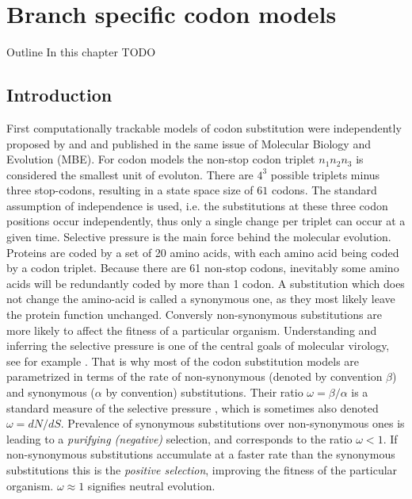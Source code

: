\chapter{Branch specific codon models\label{chap:dpp}}

\begin{remark}{Outline}
In this chapter
TODO
\end{remark}

\section{Introduction}

First computationally trackable models of codon substitution were independently proposed by \cite{Muse1994} and \cite{Goldman1994} and published in the same issue of Molecular Biology and Evolution (MBE).
For codon models the non-stop codon triplet $n_{1}n_{2}n_{3}$ is considered the smallest unit of evoluton.
There are $4^3$ possible triplets minus three stop-codons, resulting in a state space size of $61$ codons.
The standard assumption of independence is used, i.e. the substitutions at these three codon positions occur independently, thus only a single change per triplet can occur at a given time.
Selective pressure is the main force behind the molecular evolution.
Proteins are coded by a set of 20 amino acids, with each amino acid being coded by a codon triplet. 
Because there are 61 non-stop codons, inevitably some amino acids will be redundantly coded by more than 1 codon.
A substitution which does not change the amino-acid is called a synonymous 
one,
as they most likely leave the protein function unchanged.
Conversly non-synonymous substitutions are more likely to affect the fitness of a particular organism.
Understanding and inferring the selective pressure is one of the central goals of molecular virology, see for example \citet{Bielejec2014a}.
That is why most of the codon substitution models are parametrized in terms of the rate of non-synonymous (denoted by convention $\beta$) and synonymous ($\alpha$ by convention) substitutions.
Their ratio $\omega=\beta / \alpha$ is a standard measure of the selective pressure \citep{ThePhylogeneticHandbook}, which is sometimes also denoted $\omega = dN/dS$.
Prevalence of synonymous substitutions over non-synonymous ones is leading to a \emph{purifying (negative)} selection, and corresponds to the ratio $\omega <1$.
If non-synonymous substitutions accumulate at a faster rate than the synonymous substitutions this is the \emph{positive selection}, improving the fitness of the particular organism.
$\omega\approx1$ signifies neutral evolution.

